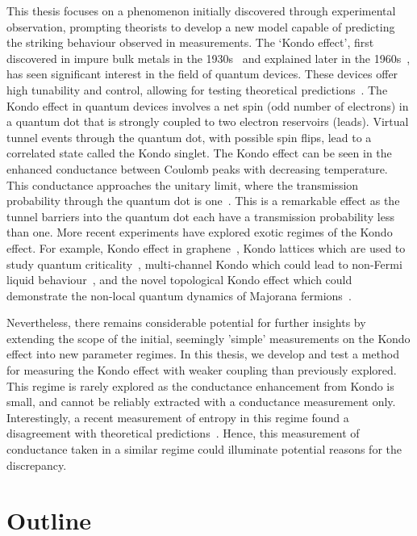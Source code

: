 This thesis focuses on a phenomenon initially discovered through experimental observation, prompting theorists to develop a new model capable of predicting the striking behaviour observed in measurements. The `Kondo effect', first discovered in impure bulk metals in the 1930s~\cite{de_haas} and explained later in the 1960s~\cite{jun_kondo}, has seen significant interest in the field of quantum devices. These devices offer high tunability and control, allowing for testing theoretical predictions~\cite{costi_kondo_mv_eo_regime}. 
The Kondo effect in quantum devices involves a net spin (odd number of electrons) in a quantum dot that is strongly coupled to two electron reservoirs (leads). Virtual tunnel events through the quantum dot, with possible spin flips, lead to a correlated state called the Kondo singlet. The Kondo effect can be seen in the enhanced conductance between Coulomb peaks with decreasing temperature. This conductance approaches the unitary limit, where the transmission probability through the quantum dot is one~\cite{kondo_unitary, kondo_unitary_theory, yigal_kondo}. This is a remarkable effect as the tunnel barriers into the quantum dot each have a transmission probability less than one. More recent experiments have explored exotic regimes of the Kondo effect. For example, Kondo effect in graphene~\cite{kondo_graphene}, Kondo lattices which are used to study quantum criticality~\cite{kondolattice}, multi-channel Kondo which could lead to non-Fermi liquid
behaviour~\cite{potok_2ck, iftikhar_2ck, kirchner_2ck}, and the novel topological Kondo effect which could demonstrate the non-local quantum dynamics of Majorana fermions~\cite{topological_kondo_majorana, topological_kondo, kondo_topological}.

Nevertheless, there remains considerable potential for further insights by extending the scope of the initial, seemingly 'simple' measurements on the Kondo effect into new parameter regimes. In this thesis, we develop and test a method for measuring the Kondo effect with weaker coupling than previously explored. This regime is rarely explored as the conductance enhancement from Kondo is small, and cannot be reliably extracted with a conductance measurement only. Interestingly, a recent measurement of entropy in this regime found a disagreement with theoretical predictions~\cite{child_strong}. Hence, this measurement of conductance taken in a similar regime could illuminate potential reasons for the discrepancy.




\section{Outline}


